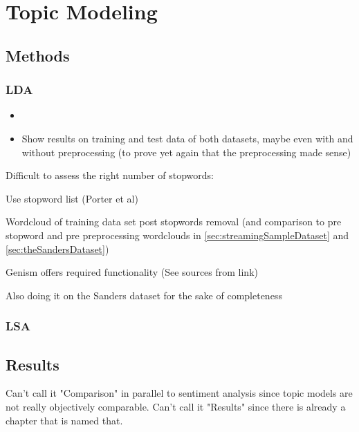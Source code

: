\chapter{Topic Modeling}
\label{ch:topicModeling}


\section{Methods}
\label{sec:methods}

\subsection{LDA}
\label{subsec:lda}

\begin{itemize}
    \item

    \item
    Show results on training and test data of both datasets, maybe even with and without preprocessing (to prove yet again that the preprocessing made sense)

\end{itemize}

Difficult to assess the right number of stopwords:

Use stopword list %
(Porter et al)

Wordcloud of training data set post stopwords removal (and comparison to pre stopword and pre preprocessing wordclouds in \ref{sec:streamingSampleDataset} and \ref{sec:theSandersDataset})

Genism offers required functionality (See sources from link)%

Also doing it on the Sanders dataset for the sake of completeness

\subsection{LSA}
\label{subsec:lsa}

\section{Results}
\label{sec:results}

Can't call it "Comparison" in parallel to sentiment analysis since topic models are not really objectively comparable.
Can't call it "Results" since there is already a chapter that is named that.